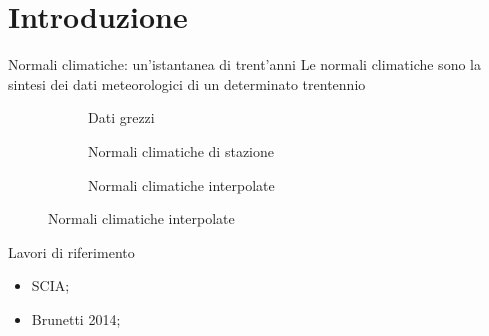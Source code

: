 
\section{Introduzione}
\begin{frame}{Normali climatiche: un'istantanea di trent'anni}
  Le normali climatiche sono la sintesi dei dati meteorologici di un determinato trentennio
  \begin{figure}
    \centering
    \begin{subfigure}[b]{0.3\textwidth}
      \caption{Dati grezzi}
    \end{subfigure}
    \begin{subfigure}[b]{0.3\textwidth}
      \caption{Normali climatiche di stazione}
    \end{subfigure}
    \hfill
    \begin{subfigure}[b]{0.3\textwidth}
      \caption{Normali climatiche interpolate}
    \end{subfigure}
  \end{figure}
\end{frame}

\begin{frame}{Lavori di riferimento}
  \begin{itemize}
    \item SCIA;
    \item Brunetti 2014;
  \end{itemize}
\end{frame}